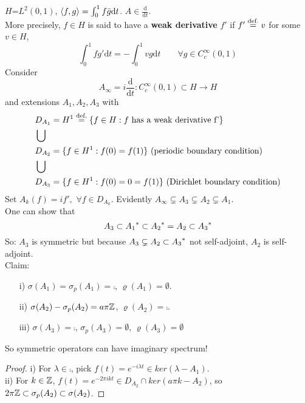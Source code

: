 \documentclass{article}
\begin{document}
\begin{example}\nl
	$H$=$L^2(0,1)$, $\left<{f},{g}\right>=\int_0^1f\bar{g} \mathrm{d}t$. $A\in\frac{\mathrm{d}}{\mathrm{d}t}$.\\
	More precisely, $f\in  H$ is said to have a \textbf{weak derivative} $f'$ if $f'\stackrel{\text{def.}}{=}{v}$ for some $v\in   H$, 
 $$\int_0^1 fg'\mathrm{d}t=-\int_0^1 vg\mathrm{d}t \qquad \forall g\in C^\infty_c(0,1)$$
	Consider
	$$
		A_\infty =i\frac{\mathrm{d}}{\mathrm{d}t}:C^\infty_c(0,1)\subset H\to H
	$$
	and extensions $A_1, A_2, A_3$ with
	\begin{equation}
		\begin{aligned}
			 & D_{A_1}=H^1\stackrel{\text{def.}}{=}\{f\in H: f \text{ has a weak derivative  f'}\} \\
			 & \bigcup                                                            \\
			 & D_{A_2}=\{f\in H^1:f(0)=f(1)\}\text{ (periodic boundary condition)}             \\
			 & \bigcup                                                            \\
			 & D_{A_3}=\{f\in H^1: f(0)=0=f(1)\}\text{ (Dirichlet boundary condition)}         \\
		\end{aligned}
	\end{equation}
	Set $A_k(f)=if',\,\,\forall f\in D_{A_k}$. Evidently $ A_\infty\subsetneq A_3\subsetneq A_2 \subsetneq A_1$.\\
	One can show that
	$$
		A_3\subset{A_1}^*\subset{A_2}^*=A_2\subset{A_3}^*
	$$
	So: $A_3$ is symmetric but because $A_3\subsetneq A_2\subset {A_3}^*$ not self-adjoint, $A_2$ is self-adjoint.\\
	Claim:
	\begin{itemize}
		\item [i)] $\sigma(A_1)=\sigma_p(A_1)=\comp$, $ \varrho(A_1)=\emptyset$.
		\item [ii)] $\sigma(A_2)-\sigma_p(A_2)=a\pi\mathbb{Z}$, $\varrho(A_2)=\comp$.
		\item [iii)] $\sigma(A_3)=\comp$, $\sigma_p(A_3)=\emptyset$, $\varrho(A_3)=\emptyset$
	\end{itemize}
	So symmetric operators can have imaginary spectrum!
	\begin{proof}
		i) For $\lambda\in\comp$, pick $f(t)=e^{-i\lambda t}\in ker(\lambda-A_1)$.\\
		ii) For $k\in\mathbb{Z}$, $f(t)=e^{-2\pi ikt}\in D_{A_2}\cap ker(a\pi k-A_2)$,
		so $2\pi \mathbb{Z}\subset \sigma_p(A_2)\subset\sigma(A_2)$.

\end{proof}
\end{example}
\end{document}
